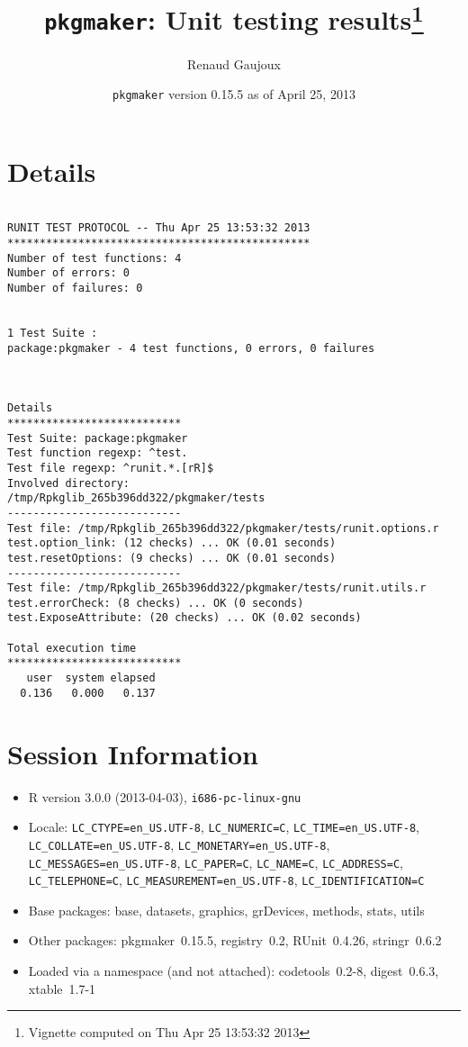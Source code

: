 \documentclass[10pt]{article}
\author{Renaud Gaujoux}
\title{\texttt{pkgmaker}: Unit testing results\footnote{Vignette computed  on Thu Apr 25 13:53:32 2013}}
\date{\texttt{pkgmaker} version 0.15.5 as of April 25, 2013}
\begin{document}
\maketitle

\section{Details}
\begin{verbatim}

RUNIT TEST PROTOCOL -- Thu Apr 25 13:53:32 2013 
*********************************************** 
Number of test functions: 4 
Number of errors: 0 
Number of failures: 0 

 
1 Test Suite : 
package:pkgmaker - 4 test functions, 0 errors, 0 failures



Details 
*************************** 
Test Suite: package:pkgmaker 
Test function regexp: ^test. 
Test file regexp: ^runit.*.[rR]$ 
Involved directory: 
/tmp/Rpkglib_265b396dd322/pkgmaker/tests 
--------------------------- 
Test file: /tmp/Rpkglib_265b396dd322/pkgmaker/tests/runit.options.r 
test.option_link: (12 checks) ... OK (0.01 seconds)
test.resetOptions: (9 checks) ... OK (0.01 seconds)
--------------------------- 
Test file: /tmp/Rpkglib_265b396dd322/pkgmaker/tests/runit.utils.r 
test.errorCheck: (8 checks) ... OK (0 seconds)
test.ExposeAttribute: (20 checks) ... OK (0.02 seconds)

Total execution time
***************************
   user  system elapsed 
  0.136   0.000   0.137 

\end{verbatim}

\section*{Session Information}
\begin{itemize}\raggedright
  \item R version 3.0.0 (2013-04-03), \verb|i686-pc-linux-gnu|
  \item Locale: \verb|LC_CTYPE=en_US.UTF-8|, \verb|LC_NUMERIC=C|, \verb|LC_TIME=en_US.UTF-8|, \verb|LC_COLLATE=en_US.UTF-8|, \verb|LC_MONETARY=en_US.UTF-8|, \verb|LC_MESSAGES=en_US.UTF-8|, \verb|LC_PAPER=C|, \verb|LC_NAME=C|, \verb|LC_ADDRESS=C|, \verb|LC_TELEPHONE=C|, \verb|LC_MEASUREMENT=en_US.UTF-8|, \verb|LC_IDENTIFICATION=C|
  \item Base packages: base, datasets, graphics, grDevices, methods,
    stats, utils
  \item Other packages: pkgmaker~0.15.5, registry~0.2, RUnit~0.4.26,
    stringr~0.6.2
  \item Loaded via a namespace (and not attached): codetools~0.2-8,
    digest~0.6.3, xtable~1.7-1
\end{itemize}
\end{document}
